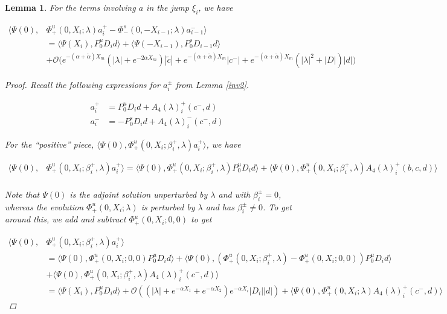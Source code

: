 \documentclass[12pt]{article}
\newtheorem{lemma}{Lemma}
\begin{document}
\begin{lemma}\label{jumpa}
For the terms involving $a$ in the jump $\xi_i$, we have

\begin{align*}
\langle \Psi(0), &\Phi^u_+(0, X_i; \lambda)a_i^+ - \Phi^s_-(0, -X_{i-1}; \lambda)a_{i-1}^- \rangle \\
&= \langle \Psi(X_i), P^u_0 D_i d \rangle + \langle \Psi(-X_{i-1}), P^s_0 D_{i-1} d \rangle \\
&+ \mathcal{O}\Big( e^{-(\alpha + \tilde{\alpha}) X_m} (|\lambda| + e^{-2 \alpha X_m}) |\tilde{c}| + e^{-(\alpha + \tilde{\alpha})X_m} |c^-| 
+ e^{-(\alpha + \tilde{\alpha})X_m}(|\lambda|^2 + |D| )|d| \Big)
\end{align*}

\begin{proof}

Recall the following expressions for $a_i^\pm$ from Lemma \ref{inv2}.

\begin{align*}
a_i^+ &= P^u_0 D_i d + A_4(\lambda)_i^+(c^-, d)\\
a_i^- &= -P^s_0 D_i d + A_4(\lambda)_i^-(c^-, d)
\end{align*}

For the ``positive'' piece, $\langle \Psi(0), \Phi^u_+(0, X_i; \beta_i^+, \lambda)a_i^+ \rangle$, we have

\begin{align*}
\langle \Psi(0), &\Phi^u_+(0, X_i; \beta_i^+, \lambda) a_i^+ \rangle = \langle \Psi(0), \Phi^u_+(0, X_i; \beta_i^+, \lambda) P^u_0 D_i d \rangle + \langle \Psi(0), \Phi^u_+(0, X_i; \beta_i^+, \lambda) A_4(\lambda)_i^+(b, c, d) \rangle \\
\end{align*} 

Note that $\Psi(0)$ is the adjoint solution unperturbed by $\lambda$ and with $\beta_i^\pm = 0$, whereas the evolution $\Phi^u_+(0, X_i; \lambda)$ is perturbed by $\lambda$ and has $\beta_i^\pm \neq 0$. To get around this, we add and subtract $\Phi^u_+(0, X_i; 0, 0)$ to get

\begin{align*}
\langle \Psi(0), &\Phi^u_+(0, X_i; \beta_i^+, \lambda) a_i^+ \rangle \\
&= \langle \Psi(0), \Phi^u_+(0, X_i; 0, 0) P^u_0 D_i d \rangle + \langle \Psi(0), (\Phi^u_+(0, X_i; \beta_i^+, \lambda) - \Phi^u_+(0, X_i; 0, 0)) P^u_0 D_i d \rangle \\
&+ \langle \Psi(0), \Phi^u_+(0, X_i; \beta_i^+, \lambda) A_4(\lambda)_i^+(c^-,d) \rangle \\
&= \langle \Psi(X_i), P^u_0 D_i d \rangle 
+ \mathcal{O}((|\lambda| + e^{-\alpha X_1} + e^{-\alpha X_2} ) e^{-\alpha X_i}|D_i||d|) + \langle \Psi(0), \Phi^u_+(0, X_i; \lambda) A_4(\lambda)_i^+(c^-,d) \rangle 
\end{align*}


\end{proof}
\end{lemma}
\end{document}
